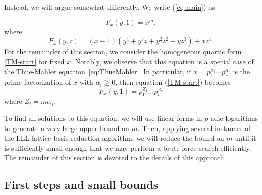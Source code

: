  
 
 Instead, we will argue somewhat differently. We write (\ref{eq-main}) as
 
 \begin{equation} \label{TM-start}
 F_x(y,1) = x^m,
 \end{equation}
 where
 $$
 F_x(y,z) = (x-1)(y^4 + y^3z + y^2z^2 + yz^3) + xz^4.
 $$
For the remainder of this section, we consider the homogeneous quartic form \eqref{TM-start} for fixed $x$. Notably, we observe that this equation is a special case of the Thue-Mahler equation~\eqref{eq:ThueMahler}. In particular, if $x = p_1^{\alpha_1}\cdots p_v^{\alpha_v}$ is the prime factorization of $x$ with $\alpha_i \geq 0$, then equation (\ref{TM-start}) becomes 
\begin{equation}\label{Eq:main}
F_x(y,1) =  p_1^{Z_1}\dots p_v^{Z_v}
\end{equation}
where $Z_i = m\alpha_i$. 

To find all solutions to this equation, we will use linear forms in $p$-adic logarithms to generate a very large upper bound on $m$. Then, applying several instances of the LLL lattice basis reduction algorithm, we will reduce the bound on $m$ until it is sufficiently small enough that we may perform a brute force search efficiently. The remainder of this section is devoted to the details of this approach.


\subsection{First steps and small bounds}
\label{subsec:FirstStepsSmallBoundsGE}

